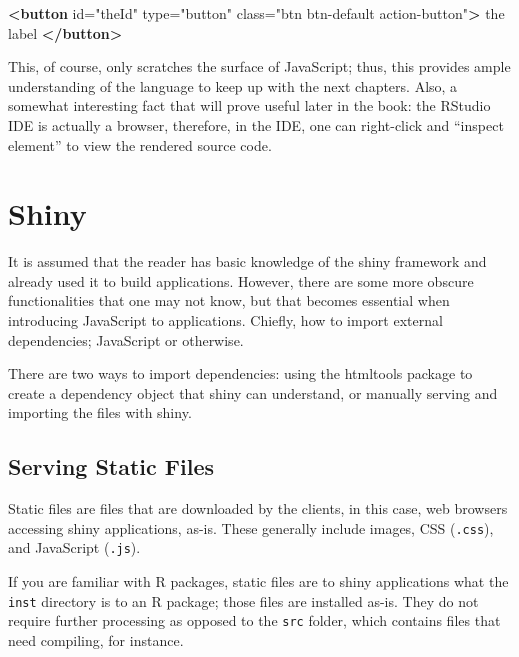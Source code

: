 \documentclass[
]{krantz}
\makeatletter
\newenvironment{Shaded}{\begin{snugshade}}{\end{snugshade}}
\newcommand{\KeywordTok}[1]{\textcolor[rgb]{0.27,0.27,0.27}{\textbf{#1}}}
\newcommand{\NormalTok}[1]{#1}
\newcommand{\OtherTok}[1]{\textcolor[rgb]{0.37,0.37,0.37}{#1}}
\newcommand{\StringTok}[1]{\textcolor[rgb]{0.5,0.5,0.5}{#1}}
\newenvironment{kframe}{%
\medskip{}
\setlength{\fboxsep}{.8em}
 \def\at@end@of@kframe{}%
 \ifinner\ifhmode%
  \def\at@end@of@kframe{\end{minipage}}%
  \begin{minipage}{\columnwidth}%
 \fi\fi%
 \def\FrameCommand##1{\hskip\@totalleftmargin \hskip-\fboxsep
 \colorbox{shadecolor}{##1}\hskip-\fboxsep
     \hskip-\linewidth \hskip-\@totalleftmargin \hskip\columnwidth}%
 \MakeFramed {\advance\hsize-\width
   \@totalleftmargin\z@ \linewidth\hsize
   \@setminipage}}%
 {\par\unskip\endMakeFramed%
 \at@end@of@kframe}
\renewenvironment{Shaded}{\begin{kframe}}{\end{kframe}}
\makeatother
\begin{document}
\begin{Shaded}
\begin{Highlighting}[]
\KeywordTok{<button} 
\OtherTok{  id=}\StringTok{"theId"} 
\OtherTok{  type=}\StringTok{"button"} 
\OtherTok{  class=}\StringTok{"btn btn{-}default action{-}button"}\KeywordTok{>}
\NormalTok{  the label}
\KeywordTok{</button>}
\end{Highlighting}
\end{Shaded}

This, of course, only scratches the surface of JavaScript; thus, this provides ample understanding of the language to keep up with the next chapters. Also, a somewhat interesting fact that will prove useful later in the book: the RStudio IDE is actually a browser, therefore, in the IDE, one can right-click and ``inspect element'' to view the rendered source code.

\hypertarget{basics-shiny}{%
\section{Shiny}\label{basics-shiny}}

It is assumed that the reader has basic knowledge of the shiny framework and already used it to build applications. However, there are some more obscure functionalities that one may not know, but that becomes essential when introducing JavaScript to applications. Chiefly, how to import external dependencies; JavaScript or otherwise.

There are two ways to import dependencies: using the htmltools \citep{R-htmltools} package to create a dependency object that shiny can understand, or manually serving and importing the files with shiny.

\hypertarget{basics-static-files}{%
\subsection{Serving Static Files}\label{basics-static-files}}

Static files are files that are downloaded by the clients, in this case, web browsers accessing shiny applications, as-is. These generally include images, CSS (\texttt{.css}), and JavaScript (\texttt{.js}).

If you are familiar with R packages, static files are to shiny applications what the \texttt{inst} directory is to an R package; those files are installed as-is. They do not require further processing as opposed to the \texttt{src} folder, which contains files that need compiling, for instance.
\end{document}
